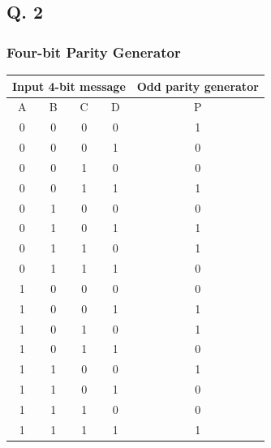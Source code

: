 \subsection*{Q. 2}
\subsubsection*{Four-bit Parity Generator}
\vspace{-1.2em}
\begin{longtable}[c]{cccc|c}
\multicolumn{4}{l|}{Input 4-bit message} & \multicolumn{1}{l}{Odd parity generator} \\ \hline
\endfirsthead
%
\endhead
%
\hline
\endfoot
%
\endlastfoot
%
A        & B        & C        & D       & P                                        \\ \hline
0        & 0        & 0        & 0       & 1                                        \\
0        & 0        & 0        & 1       & 0                                        \\
0        & 0        & 1        & 0       & 0                                        \\
0        & 0        & 1        & 1       & 1                                        \\
0        & 1        & 0        & 0       & 0                                        \\
0        & 1        & 0        & 1       & 1                                        \\
0        & 1        & 1        & 0       & 1                                        \\
0        & 1        & 1        & 1       & 0                                        \\
1        & 0        & 0        & 0       & 0                                        \\
1        & 0        & 0        & 1       & 1                                        \\
1        & 0        & 1        & 0       & 1                                        \\
1        & 0        & 1        & 1       & 0                                        \\
1        & 1        & 0        & 0       & 1                                        \\
1        & 1        & 0        & 1       & 0                                        \\
1        & 1        & 1        & 0       & 0                                        \\
1        & 1        & 1        & 1       & 1                                        \\ \hline
\end{longtable}
